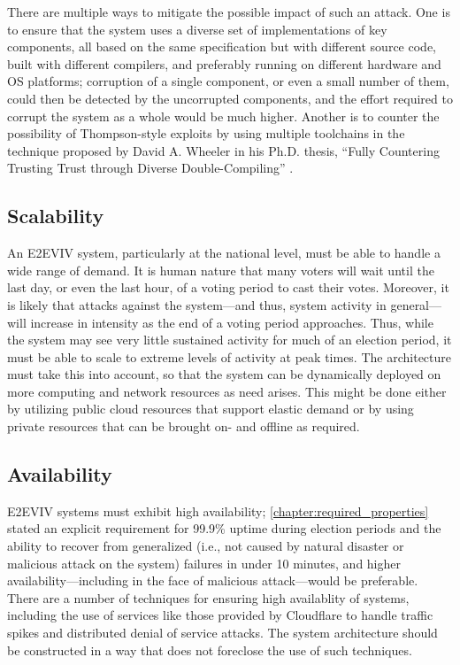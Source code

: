 There are multiple ways to mitigate the possible impact of such an
attack. One is to ensure that the system uses a diverse set of
implementations of key components, all based on the same specification
but with different source code, built with different compilers, and
preferably running on different hardware and OS platforms; corruption
of a single component, or even a small number of them, could then be
detected by the uncorrupted components, and the effort required to
corrupt the system as a whole would be much higher. Another is to
counter the possibility of Thompson-style exploits by using multiple
toolchains in the technique proposed by David A. Wheeler in his
Ph.D. thesis, ``Fully Countering Trusting Trust through Diverse
Double-Compiling'' \cite{Wheeler09}.

\subsection{Scalability}

An E2EVIV system, particularly at the national level, must be able to
handle a wide range of demand. It is human nature that many voters
will wait until the last day, or even the last hour, of a voting
period to cast their votes. Moreover, it is likely that attacks
against the system---and thus, system activity in general---will
increase in intensity as the end of a voting period approaches. Thus,
while the system may see very little sustained activity for much of an
election period, it must be able to scale to extreme levels of
activity at peak times. The architecture must take this into account,
so that the system can be dynamically deployed on more computing and
network resources as need arises. This might be done either by
utilizing public cloud resources that support elastic demand or by
using private resources that can be brought on- and offline as
required.

\subsection{Availability}

E2EVIV systems must exhibit high availability;
\autoref{chapter:required_properties} stated an explicit requirement
for 99.9\% uptime during election periods and the ability to recover
from generalized (i.e., not caused by natural disaster or malicious
attack on the system) failures in under 10 minutes, and higher
availability---including in the face of malicious attack---would be
preferable. There are a number of techniques for ensuring high
availablity of systems, including the use of services like those
provided by Cloudflare to handle traffic spikes and distributed denial
of service attacks. The system architecture should be constructed in a
way that does not foreclose the use of such techniques.

